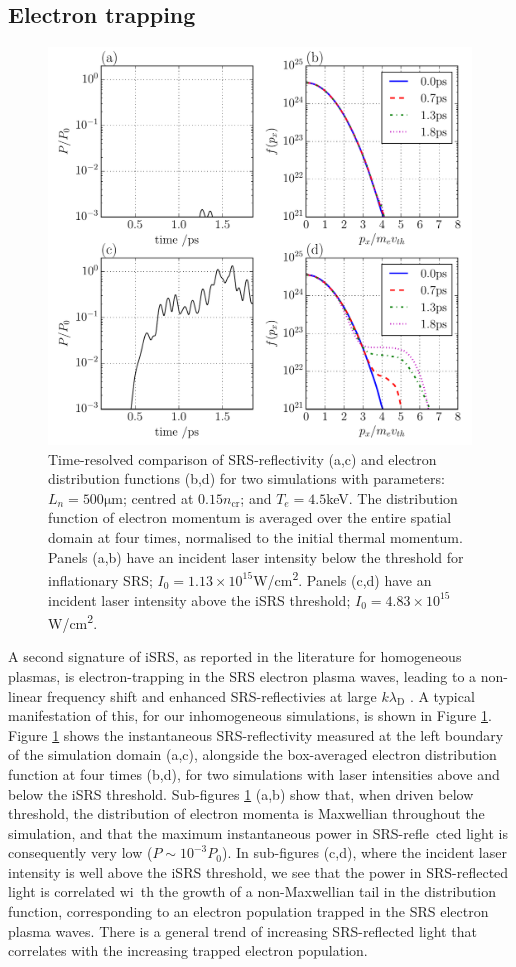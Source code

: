 \subsection{Electron trapping}
\begin{figure}[!ht]
 \centering
 \includegraphics[width=0.7\columnwidth]{Chapters/C4_iSRS/fig3_3a_3b_3c_3d.pdf}
 \caption{Time-resolved comparison of SRS-reflectivity (a,c) and electron distribution 
 functions (b,d) for two simulations with parameters: $L_n = 500 \si{\micro\metre} $; centred
 at $0.15n_\mathrm{cr}$; and $T_e = 4.5$\si{\kilo\electronvolt}. The distribution function of
 electron momentum is averaged over the entire spatial domain at four times, normalised to the initial thermal momentum. Panels (a,b) have an incident laser intensity below the threshold for inflationary SRS; $I_0 = 1.13\times10^{15}$\si{W/\centi\metre^2}. Panels (c,d) have an incident laser intensity above the iSRS threshold; $I_0 = 4.83\times10^{15}$\si{W/\centi\metre^2}.}
 \label{fig:reflAndDist}
\end{figure}

A second signature of iSRS, as reported in the literature for homogeneous plasmas, is electron-trapping in the SRS electron plasma waves, leading to a
non-linear frequency shift and enhanced SRS-reflectivies at large $k\lambda_\mathrm{D}$ \cite{Vu2002}.
A typical manifestation of this, for our inhomogeneous simulations, is shown in Figure \ref{fig:reflAndDist}. Figure \ref{fig:reflAndDist}
shows the instantaneous SRS-reflectivity measured at the left boundary of the simulation domain (a,c), alongside the box-averaged electron
distribution function at four times (b,d), for two simulations with laser intensities above and below the iSRS threshold.
Sub-figures \ref{fig:reflAndDist} (a,b) show that, when driven below threshold, the distribution of electron momenta is Maxwellian throughout the simulation, and that the maximum instantaneous power in SRS-refle\
cted light is consequently very low ($P \sim 10^{-3}P_0$). In sub-figures (c,d), where the incident laser intensity is well above the iSRS threshold, we see that the power in SRS-reflected light is correlated wi\
th the growth of a non-Maxwellian tail in the distribution function, corresponding to an electron population trapped in the SRS electron plasma waves.
There is a general trend of increasing SRS-reflected light that correlates with
the increasing trapped electron population.


